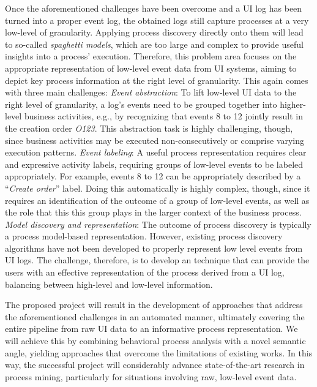 Once the aforementioned challenges have been overcome and a UI log has been turned into a proper event log, the obtained logs still capture processes at a very low-level of granularity. Applying process discovery directly onto them will lead to so-called \emph{spaghetti models}, which are too large and complex to provide useful insights into a process' execution.
Therefore, this problem area focuses on the appropriate representation of low-level event data from UI systems, aiming to depict key process information at the right level of granularity. This again comes with three main challenges: 
\vspace{0.2em}
\newline%
\noindent\textit{Event abstraction}: To lift low-level UI data to the right level of granularity, a log's events need to be grouped together into higher-level business activities, e.g., by recognizing that events 8 to 12 jointly result in the creation order \emph{O123}. This abstraction task is highly challenging, though, since business activities may be executed non-consecutively or comprise varying execution patterns.
\vspace{0.2em}
\newline%
\noindent \textit{Event labeling}: A useful process representation requires clear and expressive activity labels, requiring groups of low-level events to be labeled appropriately. For example, events 8 to 12 can be appropriately described by a ``\textit{Create order}'' label. Doing this automatically is highly complex, though, since it requires an identification of the  outcome of a group of low-level events, as well as the role that this this group plays in the larger context of the business process.
 \vspace{0.2em}
 \newline%
\noindent \textit{Model discovery and representation}: The outcome of process discovery is typically a process model-based representation. However, existing process discovery algorithms have not been developed to properly represent low level events from UI logs. The challenge, therefore, is to develop an technique that can provide the users with an effective representation of the process derived from a UI log, balancing between high-level and low-level information.

 The proposed project will result in the development of approaches that address the aforementioned challenges in an automated manner, ultimately covering the entire pipeline from raw UI data  to an informative process representation. We will achieve this by combining behavioral process analysis with a novel semantic angle, yielding approaches that overcome the limitations of existing works. In this way, the successful project will considerably advance state-of-the-art research in process mining, particularly for situations involving raw, low-level event data.

